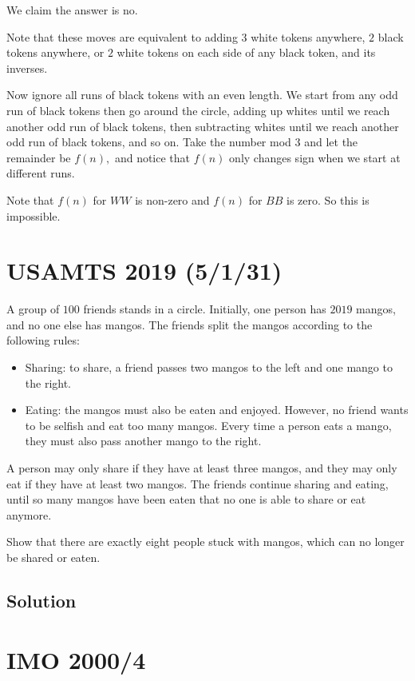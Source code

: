 \documentclass[mast]{lucky}
\begin{document}
We claim the answer is no.

Note that these moves are equivalent to adding $3$ white tokens anywhere, $2$ black tokens anywhere, or $2$ white tokens on each side of any black token, and its inverses.

Now ignore all runs of black tokens with an even length. We start from any odd run of black tokens then go around the circle, adding up whites until we reach another odd run of black tokens, then subtracting whites until we reach another odd run of black tokens, and so on. Take the number mod $3$ and let the remainder be $f(n),$ and notice that $f(n)$ only changes sign when we start at different runs.

Note that $f(n)$ for $WW$ is non-zero and $f(n)$ for $BB$ is zero. So this is impossible.

\pagebreak\section{USAMTS 2019 (5/1/31)}

A group of $100$ friends stands in a circle. Initially, one person has $2019$ mangos, and
no one else has mangos. The friends split the mangos according to the following rules:

\begin{itemize}
     \item Sharing: to share, a friend passes two mangos to the left and one mango to the right.

     \item Eating: the mangos must also be eaten and enjoyed. However, no friend wants to be
selfish and eat too many mangos. Every time a person eats a mango, they must also
pass another mango to the right.
\end{itemize}

A person may only share if they have at least three mangos, and they may only eat if they
have at least two mangos. The friends continue sharing and eating, until so many mangos
have been eaten that no one is able to share or eat anymore.

Show that there are exactly eight people stuck with mangos, which can no longer be shared or eaten.

\subsection{Solution}
 
\pagebreak\section{IMO 2000/4} 
\end{document}
